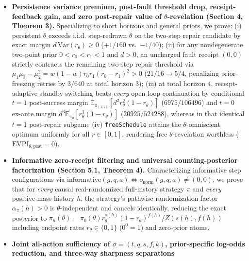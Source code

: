 \documentclass[11pt,letterpaper]{article}
\begin{document}
\begin{itemize}
  (\(53/32 \to 97/64\), gap \(9/64\)) from closing \texttt{child1} after
  \(t=0\), and the single-try specialization
  \(V_{H+1}^* = \max\{0, \Delta_0\}\) whenever \(p \ge p_1^*\) (in
  particular whenever \(p \ge S_H(d)\)), alongside \(V_H^* = 0\)
  whenever \(B_0 < c\).
\item
  \textbf{Persistence variance premium, post-fault threshold drop,
  receipt-feedback gain, and zero post-repair value of
  \(\theta\)-revelation (Section 4, Theorem 3).} Specializing to short
  horizons and general priors, we prove: (i) persistent \(\theta\)
  exceeds i.i.d. step-redrawn \(\theta\) on the two-step repair
  candidate by exact margin \(d\,\mathrm{Var}(r_\theta) \ge 0\)
  (\(+1/160\) vs.~\(-1/40\)); (ii) for any nondegenerate two-point prior
  \(0 < r_0 < r_1 < 1\) and \(d > 0\), an uncharged fault receipt
  \((0,0)\) strictly contracts the remaining two-step repair threshold
  via \(\mu_1\mu_3 - \mu_2^2 = w(1-w)r_0 r_1(r_0 - r_1)^2 > 0\)
  (\(21/16 \to 5/4\), penalizing prior-freezing retries by \(3/640\) at
  total horizon \(3\)); (iii) at total horizon \(4\), receipt-adaptive
  standby switching beats \emph{every} open-loop continuation by
  conditional \(t=1\) post-success margin
  \(\mathbb{E}_{\pi_{(1,1)}}[d^2 r_\theta^2(1 - r_\theta)]\)
  (\(6975/106496\)) and \(t=0\) ex-ante margin
  \(d^3 \mathbb{E}_{\pi_0}[r_\theta^3(1 - r_\theta)]\)
  (\(20925/524288\)), whereas in that identical \(t=1\) post-repair
  subgame (iv) \texttt{freeSchedule} attains the \(\theta\)-omniscient
  optimum uniformly for all \(r \in [0,1]\), rendering free
  \(\theta\)-revelation worthless
  (\(\mathrm{EVPI}_{\theta,\mathrm{post}} = 0\)).
\item
  \textbf{Informative zero-receipt filtering and universal
  counting-posterior factorization (Section 5.1, Theorem 4).}
  Characterizing informative step configurations via
  \(\mathrm{informative}(g, q, a) \iff o_{\mathrm{norm}}(g, q, a) \neq (0,0)\),
  we prove that for \emph{every} causal real-randomized full-history
  strategy \(\pi\) and \emph{every} positive-mass history \(h\), the
  strategy's pathwise randomization factor \(\alpha_\pi(h) > 0\) is
  \(\theta\)-independent and cancels identically, reducing the exact
  posterior to
  \(\pi_h(\theta) = \pi_0(\theta) r_\theta^{s(h)}(1 - r_\theta)^{f(h)} / Z(s(h), f(h))\)
  including endpoint rates \(r_\theta \in \{0,1\}\) (\(0^0 = 1\)) and
  zero-prior atoms.
\item
  \textbf{Joint all-action sufficiency of \(\sigma = (t, q, s, f, k)\),
  prior-specific log-odds reduction, and three-way sharpness separations
}
\end{itemize}
\end{document}
